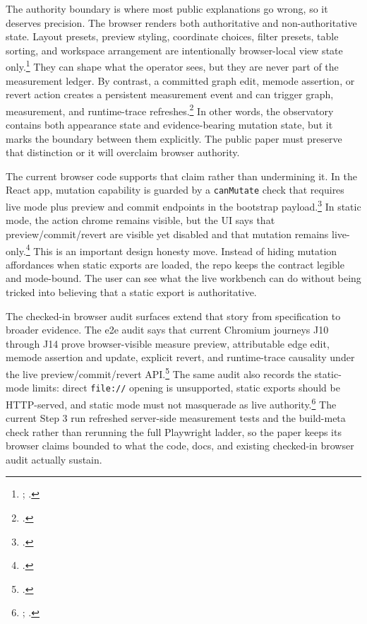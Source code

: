 \documentclass[10pt]{article}
\begin{document}
The authority boundary is where most public explanations go wrong, so it deserves precision. The browser renders both authoritative and non-authoritative state. Layout presets, preview styling, coordinate choices, filter presets, table sorting, and workspace arrangement are intentionally browser-local view state only.\footnote{; .} They can shape what the operator sees, but they are never part of the measurement ledger. By contrast, a committed graph edit, memode assertion, or revert action creates a persistent measurement event and can trigger graph, measurement, and runtime-trace refreshes.\footnote{.} In other words, the observatory contains both appearance state and evidence-bearing mutation state, but it marks the boundary between them explicitly. The public paper must preserve that distinction or it will overclaim browser authority.

The current browser code supports that claim rather than undermining it. In the React app, mutation capability is guarded by a \texttt{canMutate} check that requires live mode plus preview and commit endpoints in the bootstrap payload.\footnote{.} In static mode, the action chrome remains visible, but the UI says that preview/commit/revert are visible yet disabled and that mutation remains live-only.\footnote{.} This is an important design honesty move. Instead of hiding mutation affordances when static exports are loaded, the repo keeps the contract legible and mode-bound. The user can see what the live workbench can do without being tricked into believing that a static export is authoritative.

The checked-in browser audit surfaces extend that story from specification to broader evidence. The e2e audit says that current Chromium journeys J10 through J14 prove browser-visible measure preview, attributable edge edit, memode assertion and update, explicit revert, and runtime-trace causality under the live preview/commit/revert API.\footnote{.} The same audit also records the static-mode limits: direct \texttt{file://} opening is unsupported, static exports should be HTTP-served, and static mode must not masquerade as live authority.\footnote{; .} The current Step 3 run refreshed server-side measurement tests and the build-meta check rather than rerunning the full Playwright ladder, so the paper keeps its browser claims bounded to what the code, docs, and existing checked-in browser audit actually sustain.
\end{document}
